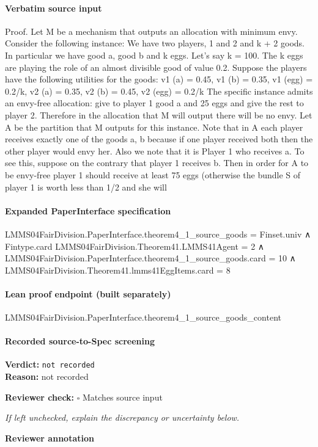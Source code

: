\documentclass[10pt]{article}
\newcommand{\reviewerbox}{%
  \par\noindent\fbox{\parbox{0.96\linewidth}{\rule{0pt}{0.38in}}}\par
}
\newcommand{\reviewmatch}[1]{%
  \par\noindent\textbf{Reviewer check:} $\square$\; #1\par
  \noindent\emph{If left unchecked, explain the discrepancy or uncertainty below.}\par
}
\begin{document}
\paragraph{Verbatim source input}
\begin{ReviewVerbatim}
Proof. Let M be a mechanism that outputs an allocation with minimum envy. Consider the following instance:
We have two players, 1 and 2 and k + 2 goods. In particular
we have good a, good b and k eggs. Let’s say k = 100. The
k eggs are playing the role of an almost divisible good of
value 0.2. Suppose the players have the following utilities
for the goods:
v1 (a) = 0.45, v1 (b) = 0.35, v1 (egg) = 0.2/k,
v2 (a) = 0.35, v2 (b) = 0.45, v2 (egg) = 0.2/k
The specific instance admits an envy-free allocation: give
to player 1 good a and 25 eggs and give the rest to player
2. Therefore in the allocation that M will output there will
be no envy. Let A be the partition that M outputs for
this instance. Note that in A each player receives exactly
one of the goods a, b because if one player received both
then the other player would envy her. Also we note that
it is Player 1 who receives a. To see this, suppose on the
contrary that player 1 receives b. Then in order for A to be
envy-free player 1 should receive at least 75 eggs (otherwise
the bundle S of player 1 is worth less than 1/2 and she will
\end{ReviewVerbatim}


\paragraph{Expanded PaperInterface specification}
\begin{ReviewVerbatim}
LMMS04FairDivision.PaperInterface.theorem4_1_source_goods = Finset.univ ∧
  Fintype.card LMMS04FairDivision.Theorem41.LMMS41Agent = 2 ∧
    LMMS04FairDivision.PaperInterface.theorem4_1_source_goods.card = 10 ∧
      LMMS04FairDivision.Theorem41.lmms41EggItems.card = 8
\end{ReviewVerbatim}

\paragraph{Lean proof endpoint (built separately)}\begin{ReviewVerbatim}
LMMS04FairDivision.PaperInterface.theorem4_1_source_goods_content
\end{ReviewVerbatim}

\paragraph{Recorded source-to-Spec screening}
\textbf{Verdict:} \texttt{not recorded}
\\
\textbf{Reason:} not recorded
\reviewmatch{Matches source input}
\noindent\textbf{Reviewer annotation}\par
\reviewerbox
\clearpage
\hypertarget{source-claim-94cdbf2e279855ef}{}
\end{document}
